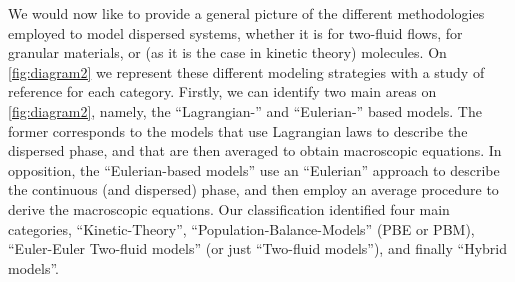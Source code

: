 We would now like to provide a general picture of the different methodologies employed to model dispersed systems, whether it is for two-fluid flows, for granular materials, or (as it is the case in kinetic theory) molecules. 
On \ref{fig:diagram2} we represent these different modeling strategies with a study of reference for each category. 
Firstly, we can identify two main areas on \ref{fig:diagram2}, namely, the ``Lagrangian-'' and ``Eulerian-'' based models. 
The former corresponds to the models that use Lagrangian laws to describe the dispersed phase, and that are then averaged to obtain macroscopic equations. 
In opposition, the ``Eulerian-based models'' use an ``Eulerian'' approach to describe the continuous (and dispersed) phase, and then employ an average procedure to derive the macroscopic equations. 
Our classification identified four main categories, ``Kinetic-Theory'', ``Population-Balance-Models'' (PBE or PBM), ``Euler-Euler Two-fluid models'' (or just ``Two-fluid models''), and finally ``Hybrid models''. 

